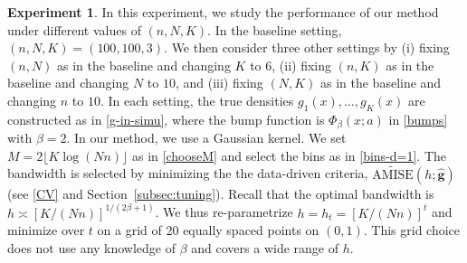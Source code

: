 \documentclass[preprint,11pt]{article}
\def\r#1{\textcolor{red}{\bf #1}}
\numberwithin{equation}{section}
\begin{document}
{\bf Experiment 1}. 
In this experiment, we study the performance of our method under different values of $(n, N, K)$.    
In the baseline setting, $(n, N, K)=(100, 100, 3)$. We then consider three other settings by (i) fixing $(n, N)$ as in the baseline and changing $K$ to $6$, (ii) fixing $(n, K)$ as in the baseline and changing $N$ to $10$, and (iii) fixing $(N, K)$ as in the baseline and changing $n$ to $10$. In each setting, the true densities $g_1(x), \ldots, g_K(x)$ are constructed as in \eqref{g-in-simu}, where the bump function is $\Phi_{\beta}(x; a)$ in \eqref{bumps} with $\beta = 2$. 
In our method, we use a Gaussian kernel. We set $M=2\lfloor K\log(Nn)\rfloor$ as in \eqref{chooseM} and select the bins as in \eqref{bins-d=1}. The bandwidth is selected by minimizing the the data-driven criteria, $\widetilde{\text{AMISE}}(h; \widehat{\bm{g}})$ (see \eqref{CV} and Section~\ref{subsec:tuning}). 
Recall that the optimal bandwidth is $h\asymp [K/(Nn)]^{1/(2\beta+1)}$. 
We thus re-parametrize $h=h_t = [K/(Nn)]^t$ and minimize over $t$ on a grid of 20 equally spaced points on $(0,1)$.  %
This grid choice does not use any knowledge of $\beta$ and covers a wide range of $h$.  
\end{document}
